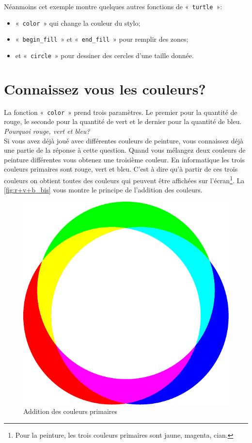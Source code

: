 Néanmoins cet exemple montre quelques autres fonctions de «~\texttt{turtle}~»:
\begin{itemize}
\item «~\texttt{color}~» qui change la couleur du stylo;
\item «~\texttt{begin\_fill}~» et «~\texttt{end\_fill}~» pour remplir des zones;
\item et «~\texttt{circle}~» pour dessiner des cercles d'une taille donnée.
\end{itemize}


\section{Connaissez vous les couleurs?}

La fonction «~\texttt{color}~» prend trois paramètres. Le premier pour la quantité de rouge, le seconde pour la quantité de vert et le dernier pour la quantité de bleu.\\

\emph{Pourquoi rouge, vert et bleu?}\\


Si vous avez déjà joué avec différentes couleurs de peinture, vous connaissez déjà une partie de la réponse à cette question. Quand vous mélangez deux couleurs de peinture différentes vous obtenez une troisième couleur. En informatique les trois couleurs primaires sont rouge, vert et bleu. C'est à dire qu'à partir de ces trois couleurs on obtient toutes des couleurs qui peuvent être affichées sur l'écran\footnote{Pour la peinture, les trois couleurs primaires sont jaune, magenta, cian.}. La \autoref{fig:r+v+b_bis} vous montre le principe de l'addition des couleurs.

\begin{figure}[h!]
\centering
\includegraphics[scale=0.6]{images/r+v+b_bis}
\caption{Addition des couleurs primaires}\label{fig:r+v+b_bis}
\end{figure}


